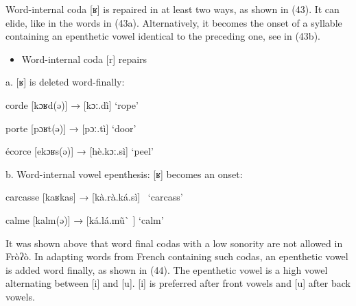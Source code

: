 Word-internal coda [ʁ] is repaired in at least two ways, as shown in (43). It can elide, like in the words in (43a). Alternatively, it becomes the onset of a syllable containing an epenthetic vowel identical to the preceding one, see in (43b). 

\begin{itemize}
\item \begin{styleindexi}
\label{bkm:Ref476053826}    Word-internal coda [r] repairs 
\end{styleindexi}\end{itemize}
\begin{styleindexi}
        a. [ʁ] is deleted word-finally: 
\end{styleindexi}

\begin{styleindexi}
          corde         [kɔʁd(ə)]        →         [kɔː.dì]          ‘rope’
\end{styleindexi}

\begin{styleindexi}
          porte           [pɔʁt(ə)]          →         [pɔː.tì]          ‘door’
\end{styleindexi}

\begin{styleindexi}
          écorce         [ekɔʁs(ə)]        →         [hè.kɔː.sì]       ‘peel’
\end{styleindexi}

\begin{styleindexi}
        b. Word-internal vowel epenthesis: [ʁ] becomes an onset: 
\end{styleindexi}

\begin{styleindexi}
          carcasse     [kaʁkas]         →         [kà.rà.ká.sì]~    ‘carcass’
\end{styleindexi}

\begin{styleindexi}
          calme           [kalm(ə)]        →         [ká.lá.mũ\`{} ]       ‘calm’
\end{styleindexi}

It was shown above that word final codas with a low sonority are not allowed in Fròʔò. In adapting words from French containing such codas, an epenthetic vowel is added word finally, as shown in (44). The epenthetic vowel is a high vowel alternating between [i] and [u]. [i] is preferred after front vowels and [u] after back vowels.

